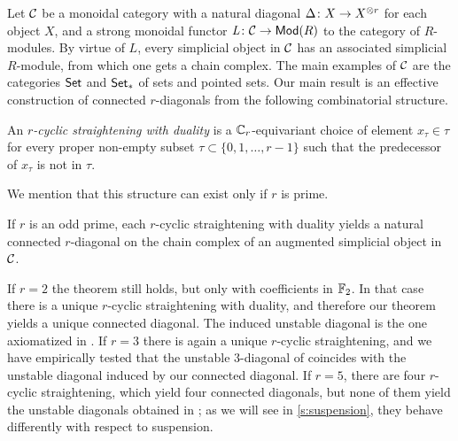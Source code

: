 Let $\mathcal{C}$ be a monoidal category with a natural diagonal $\Delta \colon X \to X^{\otimes r}$ for each object $X$, and a strong monoidal functor $\operatorname{{\it L}} \colon \mathcal{C} \to \mathsf{Mod}(R)$ to the category of $R$-modules.
By virtue of $L$, every simplicial object in $\mathcal{C}$ has an associated simplicial $R$-module, from which one gets a chain complex.
The main examples of $\mathcal{C}$ are the categories $\mathsf{Set}$ and $\mathsf{Set}_*$ of sets and pointed sets.
Our main result is an effective construction of connected $r$-diagonals from the following combinatorial structure.

\begin{definition}
	An \emph{$r$-cyclic straightening with duality} is a $\mathbb{C}_r$-equivariant choice of element $x_\tau\in \tau$ for every proper non-empty subset $\tau \subset \{0,1,\dots,r-1\}$ such that the predecessor of $x_\tau$ is not in $\tau$.
\end{definition}

We mention that this structure can exist only if $r$ is prime.

\begin{theorem}\label{thm:main}
	If $r$ is an odd prime, each $r$-cyclic straightening with duality yields a natural connected $r$-diagonal on the chain complex of an augmented simplicial object in $\mathcal{C}$.
\end{theorem}

If $r=2$ the theorem still holds, but only with coefficients in $\mathbb{F}_2$.
In that case there is a unique $r$-cyclic straightening with duality, and therefore our theorem yields a unique connected diagonal.
The induced unstable diagonal is the one axiomatized in \cite{medina2022axiomatic}.
If $r = 3$ there is again a unique $r$-cyclic straightening, and we have empirically tested that the unstable $3$-diagonal of \cite{medina2021may_st} coincides with the unstable diagonal induced by our connected diagonal.
If $r = 5$, there are four $r$-cyclic straightening, which yield four connected diagonals, but none of them yield the unstable diagonals obtained in \cite{medina2021may_st}; as we will see in \cref{s:suspension}, they behave differently with respect to suspension.

